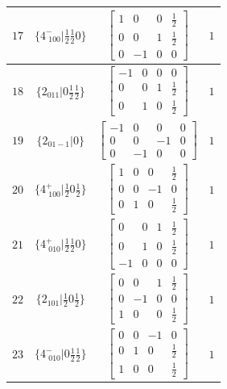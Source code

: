 \documentclass[fleqn,8pt]{jsarticle}
\begin{document}
\begin{longtable}{cccc}
$ 17 $ & $ \{4^{-}_{\,\,100}|\frac{1}{2} \frac{1}{2} 0\} $ & $ \begin{bmatrix} 1 & 0 & 0 & \frac{1}{2} \\ 0 & 0 & 1 & \frac{1}{2} \\ 0 & -1 & 0 & 0 \end{bmatrix} $ & $ 1 $ \\ \hline
$ 18 $ & $ \{2{}_{011}|0 \frac{1}{2} \frac{1}{2}\} $ & $ \begin{bmatrix} -1 & 0 & 0 & 0 \\ 0 & 0 & 1 & \frac{1}{2} \\ 0 & 1 & 0 & \frac{1}{2} \end{bmatrix} $ & $ 1 $ \\ \hline
$ 19 $ & $ \{2{}_{01-1}|0\} $ & $ \begin{bmatrix} -1 & 0 & 0 & 0 \\ 0 & 0 & -1 & 0 \\ 0 & -1 & 0 & 0 \end{bmatrix} $ & $ 1 $ \\ \hline
$ 20 $ & $ \{4^{+}_{\,\,100}|\frac{1}{2} 0 \frac{1}{2}\} $ & $ \begin{bmatrix} 1 & 0 & 0 & \frac{1}{2} \\ 0 & 0 & -1 & 0 \\ 0 & 1 & 0 & \frac{1}{2} \end{bmatrix} $ & $ 1 $ \\ \hline
$ 21 $ & $ \{4^{+}_{\,\,010}|\frac{1}{2} \frac{1}{2} 0\} $ & $ \begin{bmatrix} 0 & 0 & 1 & \frac{1}{2} \\ 0 & 1 & 0 & \frac{1}{2} \\ -1 & 0 & 0 & 0 \end{bmatrix} $ & $ 1 $ \\ \hline
$ 22 $ & $ \{2{}_{101}|\frac{1}{2} 0 \frac{1}{2}\} $ & $ \begin{bmatrix} 0 & 0 & 1 & \frac{1}{2} \\ 0 & -1 & 0 & 0 \\ 1 & 0 & 0 & \frac{1}{2} \end{bmatrix} $ & $ 1 $ \\ \hline
$ 23 $ & $ \{4^{-}_{\,\,010}|0 \frac{1}{2} \frac{1}{2}\} $ & $ \begin{bmatrix} 0 & 0 & -1 & 0 \\ 0 & 1 & 0 & \frac{1}{2} \\ 1 & 0 & 0 & \frac{1}{2} \end{bmatrix} $ & $ 1 $ \\ \hline

\end{longtable}
\end{document}
